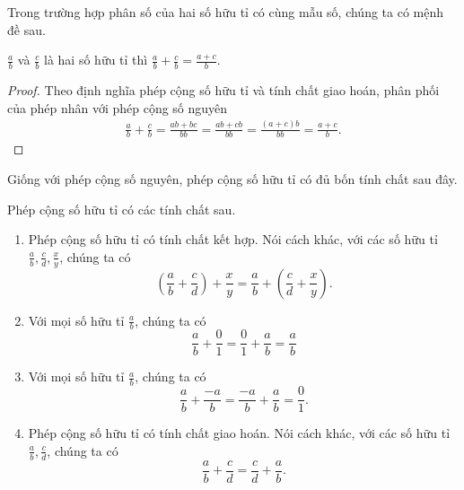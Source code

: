 Trong trường hợp phân số của hai số hữu tỉ có cùng mẫu số, chúng ta có mệnh đề sau.
\begin{theorem}\label{theorem:same-denominator}
    $\frac{a}{b}$ và $\frac{c}{b}$ là hai số hữu tỉ thì $\frac{a}{b} + \frac{c}{b} = \frac{a + c}{b}$.
\end{theorem}

\begin{proof}
    Theo định nghĩa phép cộng số hữu tỉ và tính chất giao hoán, phân phối của phép nhân với phép cộng số nguyên
    \begin{align*}
        \frac{a}{b} + \frac{c}{b} = \frac{ab + bc}{bb} = \frac{ab + cb}{bb} = \frac{(a + c)b}{bb} = \frac{a + c}{b}.
    \end{align*}
\end{proof}

Giống với phép cộng số nguyên, phép cộng số hữu tỉ có đủ bốn tính chất sau đây.
\begin{theorem}\label{theorem:property-of-rational-numbers-addition}
    Phép cộng số hữu tỉ có các tính chất sau.
    \begin{enumerate}[label={(\roman*)}]
        \item Phép cộng số hữu tỉ có tính chất kết hợp. Nói cách khác, với các số hữu tỉ $\frac{a}{b}, \frac{c}{d}, \frac{x}{y}$, chúng ta có
              \[
                  \left(\frac{a}{b} + \frac{c}{d}\right) + \frac{x}{y} = \frac{a}{b} + \left(\frac{c}{d} + \frac{x}{y}\right).
              \]
        \item Với mọi số hữu tỉ $\frac{a}{b}$, chúng ta có
              \[
                  \frac{a}{b} + \frac{0}{1} = \frac{0}{1} + \frac{a}{b} = \frac{a}{b}
              \]
        \item Với mọi số hữu tỉ $\frac{a}{b}$, chúng ta có
              \[
                  \frac{a}{b} + \frac{-a}{b} = \frac{-a}{b} + \frac{a}{b} = \frac{0}{1}.
              \]
        \item Phép cộng số hữu tỉ có tính chất giao hoán. Nói cách khác, với các số hữu tỉ $\frac{a}{b}, \frac{c}{d}$, chúng ta có
              \[
                  \frac{a}{b} + \frac{c}{d} = \frac{c}{d} + \frac{a}{b}.
              \]
    \end{enumerate}
\end{theorem}

